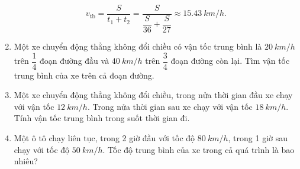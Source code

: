 \begin{enumerate}[label=\bfseries Câu \arabic*:]
{		$$v_\text{tb} = \dfrac{S}{t_1 + t_2} = \dfrac{S}{\dfrac{S}{36} + \dfrac{S}{27}} \approx \SI{15,43}{km/h}.$$
	}
	\item {}
	
	{
		
		Một xe chuyển động thẳng không đổi chiều có vận tốc trung bình là $\SI{20}{km/h}$ trên $\dfrac{1}{4}$ đoạn đường đầu và $\SI{40}{km/h}$ trên $\dfrac{3}{4}$ đoạn đường còn lại. Tìm vận tốc trung bình của xe trên cả đoạn đường.
	}
	\item {}
	
	{
		
		Một xe chuyển động thẳng không đổi chiều, trong nửa thời gian đầu xe chạy với vận tốc $\SI{12}{km/h}$. Trong nửa thời gian sau xe chạy với vận tốc $\SI{18}{km/h}$. Tính vận tốc trung bình trong suốt thời gian đi.
	}
	\item {}
	
	{
		
		Một ô tô chạy liên tục, trong 2 giờ đầu với tốc độ $\SI{80}{km/h}$, trong 1 giờ sau chạy với tốc độ $\SI{50}{km/h}$. Tốc độ trung bình của xe trong cả quá trình là bao nhiêu?
	}
\end{enumerate}